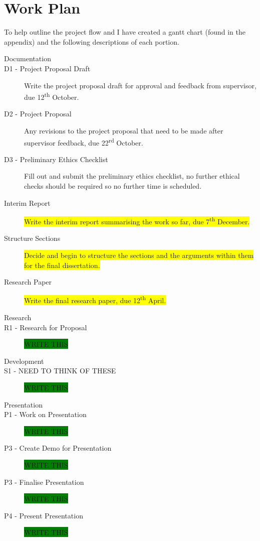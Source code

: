 \documentclass[a4paper]{article}
\begin{document}
\section{Work Plan}
To help outline the project flow and I have created a gantt chart (found in the appendix) and the following descriptions of each portion.

\begin{description}
\item [\large{Documentation}]
\item [D1 - Project Proposal Draft]
Write the project proposal draft for approval and feedback from supervisor, due 12\textsuperscript{th} October.
\item [D2 - Project Proposal]
Any revisions to the project proposal that need to be made after supervisor feedback, due 22\textsuperscript{rd} October.
\item [D3 - Preliminary Ethics Checklist]
Fill out and submit the preliminary ethics checklist, no further ethical checks should be required so no further time is scheduled.

\item [Interim Report]
\colorbox{yellow}{Write the interim report summarising the work so far, due 7\textsuperscript{th} December.}
\item [Structure Sections]
\colorbox{yellow}{Decide and begin to structure the sections and the arguments within them for the final dissertation.}
\item [Research Paper]
\colorbox{yellow}{Write the final research paper, due 12\textsuperscript{th} April.}

\item [\large{Research}]
\item [R1 - Research for Proposal]
\colorbox{green}{WRITE THIS}

\item [\large{Development}]
\item [S1 - NEED TO THINK OF THESE]
\colorbox{green}{WRITE THIS}

\item [\large{Presentation}]
\item [P1 - Work on Presentation]
\colorbox{green}{WRITE THIS}
\item [P3 - Create Demo for Presentation]
\colorbox{green}{WRITE THIS}
\item [P3 - Finalise Presentation]
\colorbox{green}{WRITE THIS}
\item [P4 - Present Presentation]
\colorbox{green}{WRITE THIS}


\end{description}
\end{document}
